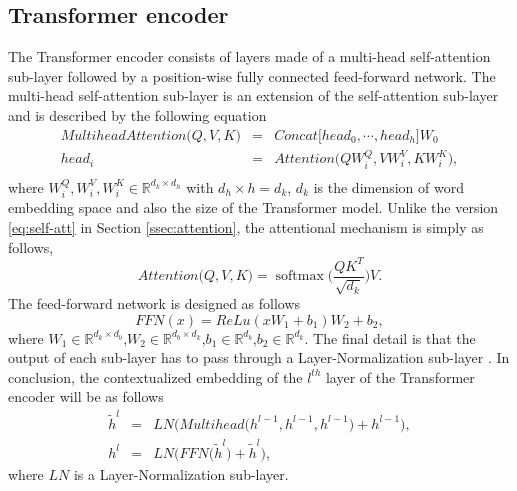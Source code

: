 \subsection{Transformer encoder}
\label{ssec:transformer-enc}
The Transformer encoder consists of layers made of a multi-head self-attention sub-layer followed by a position-wise fully connected feed-forward network. The multi-head self-attention sub-layer is an extension of the self-attention sub-layer and is described by the following equation
\begin{equation}
\begin{array}{rcl}
MultiheadAttention\big( Q,V,K \big) &=& Concat \big[ head_0, \cdots , head_h \big] W_0\\
head_i &=& Attention \big( QW_i^Q, VW_i^V, KW_i^K \big),\\
\end{array}
\end{equation}
where $W_i^Q, W_i^V, W_i^K \in \mathbb{R}^{d_k \times d_h}$ with $d_h \times h = d_k$, $d_k$ is the dimension of word embedding space and also the size of the Transformer model. Unlike the version \eqref{eq:self-att} in Section \ref{ssec:attention}, the attentional mechanism is simply as follows,
\begin{equation}
Attention\big( Q, V, K \big) = \operatorname{softmax}\big(\frac{Q K^T}{\sqrt{d_k}} \big) V.
\end{equation}
The feed-forward network is designed as follows
\begin{equation}
FFN(x) = ReLu(xW_1+b_1)W_2+b_2,
\end{equation}
where $W_1 \in \mathbb{R}^{d_k \times d_b}$,$W_2 \in \mathbb{R}^{d_b \times d_k}$,$b_1 \in \mathbb{R}^{d_b}$,$b_2 \in \mathbb{R}^{d_k}$.
The final detail is that the output of each sub-layer has to pass through a Layer-Normalization sub-layer \citep{Jimmy16layer}. In conclusion, the contextualized embedding of the $l^{th}$ layer of the Transformer encoder will be as follows
\begin{equation}
\begin{array}{rcl}
\tilde{h}^l &=& LN\bigg(Multihead\big(h^{l-1}, h^{l-1}, h^{l-1}\big) + h^{l-1}\bigg), \\ 
h^l &=& LN\bigg(FFN\big(\tilde{h}^l\big) + \tilde{h}^l\bigg),
\end{array}
\label{eq:self-att}
\end{equation}
where $LN$ is a Layer-Normalization sub-layer.
